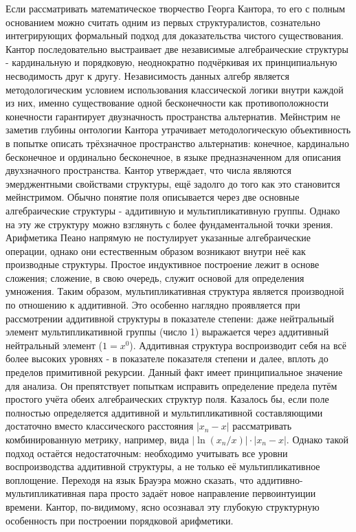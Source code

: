 \documentclass[12pt]{article}
\begin{document}
Если рассматривать математическое творчество Георга Кантора, то его с полным основанием можно считать одним из первых структуралистов, сознательно интегрирующих формальный подход для доказательства чистого существования. Кантор последовательно выстраивает две независимые алгебраические структуры - кардинальную и порядковую, неоднократно подчёркивая их принципиальную несводимость друг к другу. Независимость данных алгебр является методологическим условием использования классической логики внутри каждой из них, именно существование одной бесконечности как противоположности конечности гарантирует двузначность пространства альтернатив. Мейнстрим не заметив глубины онтологии Кантора утрачивает методологическую объективность в попытке описать трёхзначное пространство альтернатив: конечное, кардинально бесконечное и ординально бесконечное, в языке предназначенном для описания двухзначного пространства. Кантор утверждает, что числа являются эмерджентными свойствами структуры, ещё задолго до того как это становится мейнстримом. Обычно понятие поля описывается через две основные алгебраические структуры - аддитивную и мультипликативную группы. Однако на эту же структуру можно взглянуть с более фундаментальной точки зрения. Арифметика Пеано напрямую не постулирует указанные алгебраические операции, однако они естественным образом возникают внутри неё как производные структуры. Простое индуктивное построение лежит в основе сложения; сложение, в свою очередь, служит основой для определения умножения. Таким образом, мультипликативная структура является производной по отношению к аддитивной. Это особенно наглядно проявляется при рассмотрении аддитивной структуры в показателе степени: даже нейтральный элемент мультипликативной группы (число 1) выражается через аддитивный нейтральный элемент ($1 = x^0$). Аддитивная структура воспроизводит себя на всё более высоких уровнях - в показателе показателя степени и далее, вплоть до пределов примитивной рекурсии. Данный факт имеет принципиальное значение для анализа. Он препятствует попыткам исправить определение предела путём простого учёта обеих алгебраических структур поля. Казалось бы, если поле полностью определяется аддитивной и мультипликативной составляющими достаточно вместо классического расстояния $|x_n - x|$ рассматривать комбинированную метрику, например, вида $|\ln(x_n/x)| \cdot |x_n - x|$. Однако такой подход остаётся недостаточным: необходимо учитывать все уровни воспроизводства аддитивной структуры, а не только её мультипликативное воплощение. Переходя на язык Брауэра можно сказать, что аддитивно-мультипликативная пара просто задаёт новое направление первоинтуиции времени. Кантор, по-видимому, ясно осознавал эту глубокую структурную особенность при построении порядковой арифметики.
\end{document}
